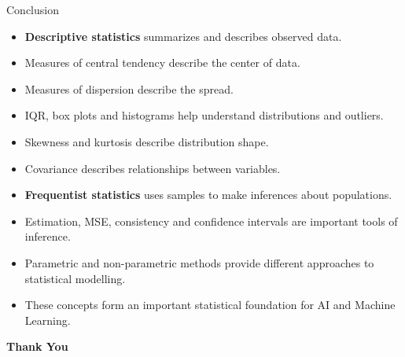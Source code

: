 \documentclass[aspectratio=169]{beamer}
\begin{document}
\begin{frame}{Conclusion}

\begin{itemize}
    \item \textbf{Descriptive statistics} summarizes and describes observed data.
    \item Measures of central tendency describe the center of data.
    \item Measures of dispersion describe the spread.
    \item IQR, box plots and histograms help understand distributions and outliers.
    \item Skewness and kurtosis describe distribution shape.
    \item Covariance describes relationships between variables.
    \item \textbf{Frequentist statistics} uses samples to make inferences about populations.
    \item Estimation, MSE, consistency and confidence intervals are important tools of inference.
    \item Parametric and non-parametric methods provide different approaches to statistical modelling.
    \item These concepts form an important statistical foundation for AI and Machine Learning.
\end{itemize}

\end{frame}

\begin{frame}
\begin{center}
\Huge
\textbf{Thank You}
\end{center}
\end{frame}
\end{document}
